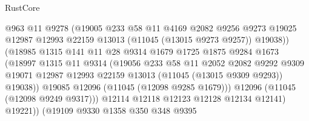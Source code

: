 \begin{lexlean}{RustCore}
\begin{coremodule}
                                @963
                                @11
                                @9278
                                (@19005
                                  @233
                                  @58
                                  @11
                                  @4169
                                  @2082
                                  @9256
                                  @9273
                                  @19025
                                  @12987
                                  @12993
                                  @22159
                                  @13013
                                  (@11045 (@13015 @9273 @9257))
                                  @19038))
                              (@18985
                                @1315
                                @141
                                @11
                                @28
                                @9314
                                @1679
                                @1725
                                @1875
                                @9284
                                @1673
                                (@18997
                                  @1315
                                  @11
                                  @9314
                                  (@19056
                                    @233
                                    @58
                                    @11
                                    @2052
                                    @2082
                                    @9292
                                    @9309
                                    @19071
                                    @12987
                                    @12993
                                    @22159
                                    @13013
                                    (@11045 (@13015 @9309 @9293))
                                    @19038))
                                @19085
                                @12096
                                (@11045 (@12098 @9285 @1679)))
                              @12096
                              (@11045 (@12098 @9249 @9317)))
                            @12114
                            @12118
                            @12123
                            @12128
                            @12134
                            @12141)
                          @19221))
                      (@19109
                        @9330
                        @1358
                        @350
                        @348
                        @9395

\end{coremodule}
\end{lexlean}
